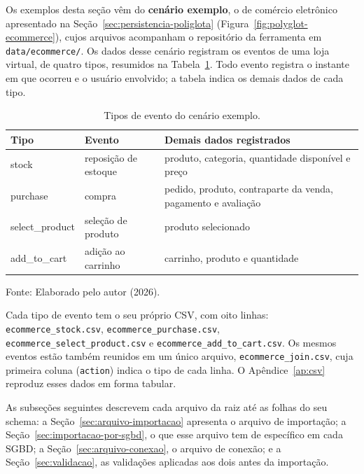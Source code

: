 Os exemplos desta seção vêm do \textbf{cenário exemplo}, o de comércio eletrônico
apresentado na Seção~\ref{sec:persistencia-poliglota} (Figura~\ref{fig:polyglot-ecommerce}), cujos
arquivos acompanham o repositório da ferramenta em \texttt{data/\allowbreak ecommerce/}.
Os dados desse cenário registram os eventos de uma loja virtual, de quatro tipos,
resumidos na Tabela~\ref{tab:eventos-ecommerce}. Todo evento registra o instante em que
ocorreu e o usuário envolvido; a tabela indica os demais dados de cada tipo.

\begin{table}[H]
  \caption{Tipos de evento do cenário exemplo.}
  \label{tab:eventos-ecommerce}
  \centering
  \begin{tabular}{>{\ttfamily}l l >{\raggedright\arraybackslash}p{6.4cm}}
    \toprule
    \normalfont\textbf{Tipo} & \textbf{Evento} & \textbf{Demais dados registrados} \\
    \midrule
    stock           & reposição de estoque & produto, categoria, quantidade disponível e preço \\
    purchase        & compra               & pedido, produto, contraparte da venda, pagamento e avaliação \\
    select\_product & seleção de produto   & produto selecionado \\
    add\_to\_cart   & adição ao carrinho   & carrinho, produto e quantidade \\
    \bottomrule
  \end{tabular}
  \par\vspace{4pt}
  {\footnotesize Fonte: Elaborado pelo autor (2026).}
\end{table}

Cada tipo de evento tem o seu próprio CSV, com oito linhas:
\texttt{ecommerce\_\allowbreak stock.csv}, \texttt{ecommerce\_\allowbreak purchase.csv},
\texttt{ecommerce\_\allowbreak select\_\allowbreak product.csv} e
\texttt{ecommerce\_\allowbreak add\_\allowbreak to\_\allowbreak cart.csv}. Os mesmos eventos estão também reunidos em um único
arquivo, \texttt{ecommerce\_join.csv}, cuja primeira coluna (\texttt{action}) indica o
tipo de cada linha. O Apêndice~\ref{ap:csv} reproduz esses dados em forma tabular.

As subseções seguintes descrevem cada arquivo da raiz até as folhas do seu schema: a
Seção~\ref{sec:arquivo-importacao} apresenta o arquivo de importação; a
Seção~\ref{sec:importacao-por-sgbd}, o que esse arquivo tem de específico em cada SGBD; a
Seção~\ref{sec:arquivo-conexao}, o arquivo de conexão; e a Seção~\ref{sec:validacao}, as
validações aplicadas aos dois antes da importação.

